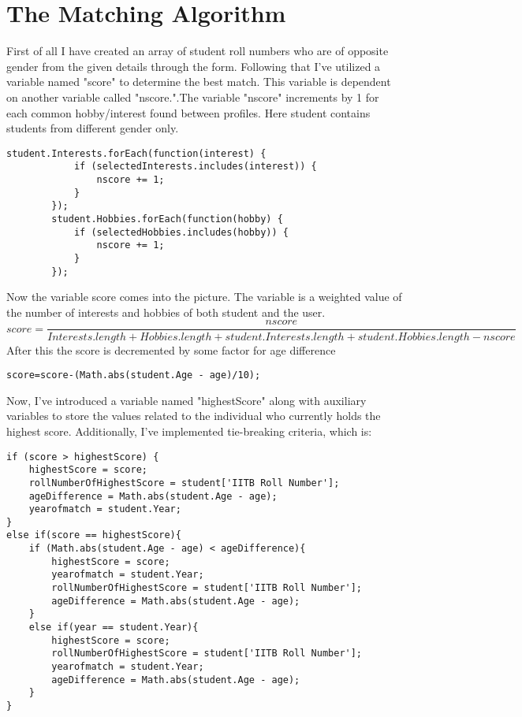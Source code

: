 \documentclass{article}
\begin{document}
\section{The Matching Algorithm}
\label{sec:algo}
First of all I have created an array of student roll numbers who are of opposite gender from the given details through the form. Following that
I've utilized a variable named "score" to determine the best match. This variable is dependent on another variable called "nscore.".The variable "nscore" increments by 1 for each common hobby/interest found between profiles. Here student contains students from different gender only.
\begin{lstlisting}[style=JavaScript]
student.Interests.forEach(function(interest) {
            if (selectedInterests.includes(interest)) {
                nscore += 1;
            }
        });
        student.Hobbies.forEach(function(hobby) {
            if (selectedHobbies.includes(hobby)) {
                nscore += 1;
            }
        });        
\end{lstlisting}
Now the variable score comes into the picture. The variable is a weighted value of the number of interests and hobbies of both student and the user.\\
\[
    score=\frac{nscore}{Interests.length+Hobbies.length+student.Interests.length+student.Hobbies.length-nscore}
\]
After this the score is decremented by some factor for age difference
\begin{lstlisting}[style=JavaScript]
            score=score-(Math.abs(student.Age - age)/10);
\end{lstlisting}
Now, I've introduced a variable named "highestScore" along with auxiliary variables to store the values related to the individual who currently holds the highest score. Additionally, I've implemented tie-breaking criteria, which is:\\
\begin{lstlisting}[style=JavaScript]
if (score > highestScore) {
    highestScore = score;
    rollNumberOfHighestScore = student['IITB Roll Number'];
    ageDifference = Math.abs(student.Age - age);
    yearofmatch = student.Year;
}
else if(score == highestScore){
    if (Math.abs(student.Age - age) < ageDifference){
        highestScore = score;
        yearofmatch = student.Year;
        rollNumberOfHighestScore = student['IITB Roll Number'];
        ageDifference = Math.abs(student.Age - age);
    }
    else if(year == student.Year){
        highestScore = score;
        rollNumberOfHighestScore = student['IITB Roll Number'];
        yearofmatch = student.Year;
        ageDifference = Math.abs(student.Age - age);
    }
}                            
\end{lstlisting}
\end{document}

